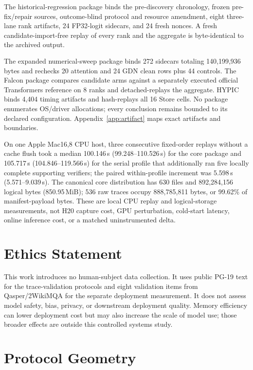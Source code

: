 \documentclass{article}
\begin{document}
The historical-regression package binds the pre-discovery chronology, frozen
pre-fix/repair sources, outcome-blind protocol and resource amendment, eight
three-lane rank artifacts, 24 FP32-logit sidecars, and 24 fresh nonces.  A fresh
candidate-import-free replay of every rank and the aggregate is byte-identical
to the archived output.

The expanded numerical-sweep package binds 272 sidecars totaling 140,199,936
bytes and rechecks 20 attention and 24 GDN clean rows plus 44 controls.  The
Falcon package compares candidate arms against a separately executed official
Transformers reference on 8 ranks and detached-replays the aggregate.  HYPIC
binds 4,404 timing artifacts and hash-replays all 16 Store cells.  No package
enumerates OS/driver allocations; every conclusion remains bounded to its
declared configuration.  Appendix~\ref{app:artifact} maps exact artifacts and
boundaries.

On one Apple Mac16,8 CPU host, three consecutive fixed-order replays without a
cache flush took a median 100.146\,s (99.248--110.526\,s) for the core package
and 105.717\,s (104.846--119.566\,s) for the serial profile that additionally
ran five locally complete supporting verifiers; the paired within-profile
increment was 5.598\,s (5.571--9.039\,s).  The canonical core distribution has
630 files and 892,284,156 logical bytes (850.95\,MiB); 536 raw traces occupy
888,785,811 bytes, or 99.62\% of manifest-payload bytes.  These are local CPU
replay and logical-storage measurements, not H20 capture cost, GPU perturbation,
cold-start latency, online inference cost, or a matched uninstrumented delta.

\section{Ethics Statement}

This work introduces no human-subject data collection.  It uses public PG-19
text for the trace-validation protocols and eight validation items from
Qasper/2WikiMQA for the separate deployment measurement.  It does not assess model
safety, bias, privacy, or downstream deployment quality.  Memory efficiency can
lower deployment cost but may also increase the scale of model use; those
broader effects are outside this controlled systems study.

\section{Protocol Geometry}
\label{app:protocol-geometry}
\end{document}
